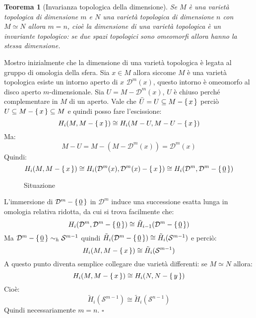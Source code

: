 \documentclass[10pt, twoside=false, x11names]{scrbook}
\newtheorem{theorem}{Teorema}[section]
\newenvironment{proof}{{\textbf{Dimostrazione}:}}{\hfill $\square$}
\newcommand{\Sph}[1][]{\mathcal{S}^#1}
\newcommand{\Disk}[1][]{\mathcal{D}^#1}
\renewcommand{\vec}[1]{\underline{#1}}
\let\setminus-
\begin{document}
\begin{theorem}[Invarianza topologica della dimensione]
  Se $ M $ è una varietà topologica di dimensione $ m $ e $ N $ una varietà
  topologica di dimensione $ n $ con $ M \simeq N $ allora $ m = n $, cioè la dimensione
  di una varietà topologica è un invariante topologico: se due spazi topologici sono
  omeomorfi allora hanno la stessa dimensione.
\end{theorem}
\begin{proof}
  Mostro inizialmente che la dimensione di una varietà topologica è legata al
  gruppo di omologia della sfera. Sia $ x \in M $ allora siccome $ M $ è una
  varietà topologica esiste un intorno aperto di $ x $ $ \Disk{m}(x) $, questo
  intorno è omeomorfo al disco aperto $ m $-dimensionale. Sia
  $ U = M \setminus \Disk{m}(x) $, $ U $ è chiuso perché complementare in $ M $ di un
  aperto. Vale che $ \bar{U} = U \subseteq M \setminus \set{x} $ perciò
  $ U \subseteq M \setminus \set{x} \subseteq M $ e quindi posso fare l'escissione:
  \[
    H_i(M, M \setminus \set{x}) \cong H_i(M \setminus U, M \setminus U \setminus \set{x})
  \]
  Ma:
  \[
    M \setminus U  = M \setminus (M \setminus \Disk{m}(x)) = \Disk{m}(x)
  \]
  Quindi:
  \[
    H_i(M, M \setminus \set{x}) \cong H_i(\Disk{m}(x), \Disk{m}(x) \setminus \set{x}) \cong H_i(\Disk{m}, \Disk{m} \setminus \set{\vec{0}})
  \]
  \begin{figure}[htbp]
    \centering
    \caption{Situazione}
    \label{fig:lez13:dimension_topological_invariance}
  \end{figure}
  L'immersione di $ \Disk{m} \setminus \set{\vec{0}} $ in $ \Disk{m} $ induce una
  successione esatta lunga in omologia relativa ridotta, da cui si trova
  facilmente che:
  \[
    H_i(\Disk{m}, \Disk{m} \setminus \set{\vec{0}}) \cong \tilde{H}_{i-1}(\Disk{m} \setminus \set{\vec{0}})
  \]
  Ma $ \Disk{m} \setminus \set{\vec{0}} \sim_h \Sph{m-1} $ quindi
  $ \tilde{H}_i(\Disk{m} \setminus \set{\vec{0}}) \cong \tilde{H}_i(\Sph{m-1}) $
  e perciò:
  \[
    H_i(M, M \setminus \set{x}) \cong \tilde{H}_i(\Sph{m-1})
  \]
  A questo punto diventa semplice collegare due varietà differenti: se $ M \simeq N $
  allora:
  \[
    H_i(M, M \setminus \set{x}) \cong H_i(N, N \setminus \set{y})
  \]
  Cioè:
  \[
    \tilde{H}_i(\Sph{m-1}) \cong \tilde{H}_i(\Sph{n-1})
  \]
  Quindi necessariamente $ m = n $.
\end{proof}
\end{document}

